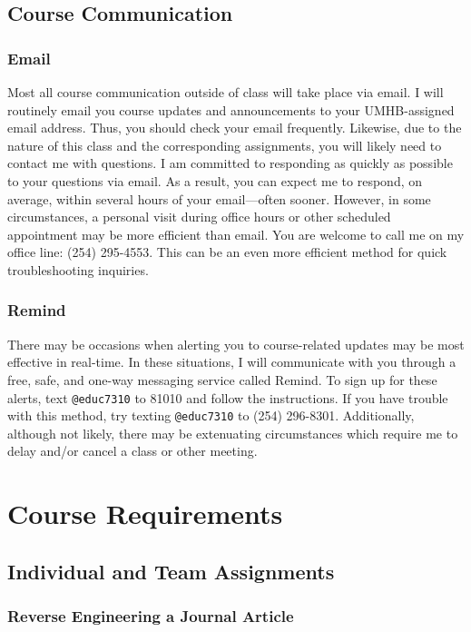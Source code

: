 \documentclass[
]{article}
\begin{document}
\subsection{Course Communication}

\subsubsection{Email}

Most all course communication outside of class will take place via
email. I will routinely email you course updates and announcements to
your UMHB-assigned email address. Thus, you should check your email
frequently. Likewise, due to the nature of this class and the
corresponding assignments, you will likely need to contact me with
questions. I am committed to responding as quickly as possible to your
questions via email. As a result, you can expect me to respond, on
average, within several hours of your email---often sooner. However, in
some circumstances, a personal visit during office hours or other
scheduled appointment may be more efficient than email. You are welcome
to call me on my office line: (254) 295-4553. This can be an even more
efficient method for quick troubleshooting inquiries.

\subsubsection{Remind}

There may be occasions when alerting you to course-related updates may
be most effective in real-time. In these situations, I will communicate
with you through a free, safe, and one-way messaging service called
Remind. To sign up for these alerts, text \texttt{@educ7310} to 81010
and follow the instructions. If you have trouble with this method, try
texting \texttt{@educ7310} to (254) 296-8301. Additionally, although not
likely, there may be extenuating circumstances which require me to delay
and/or cancel a class or other meeting.

\section{Course Requirements}

\subsection{Individual and Team Assignments}

\subsubsection{Reverse Engineering a Journal Article}
\end{document}
